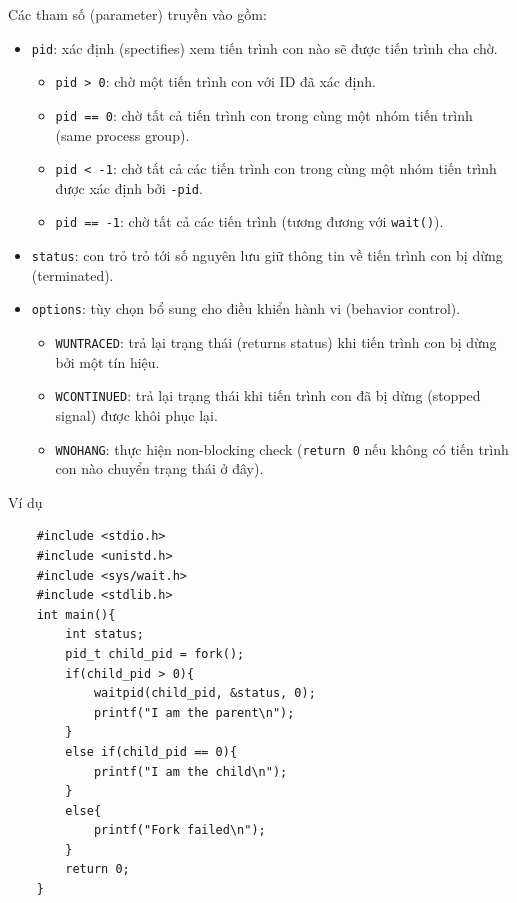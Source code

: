 \documentclass{article}
\begin{document}
\begin{enumerate}
\begin{verbatim}
\end{verbatim}
Các tham số (parameter) truyền vào gồm:
\begin{itemize}
    \item \verb|pid|: xác định (spectifies) xem tiến trình con nào sẽ được tiến trình cha chờ.
    \begin{itemize}
        \item \verb|pid > 0|: chờ một tiến trình con với ID đã xác định.
        \item \verb|pid == 0|: chờ tất cả tiến trình con trong cùng một nhóm tiến trình (same process group).
        \item \verb|pid < -1|: chờ tất cả các tiến trình con trong cùng một nhóm tiến trình được xác định bởi \verb|-pid|.
        \item \verb|pid == -1|: chờ tất cả các tiến trình (tương đương với \verb|wait()|).
    \end{itemize}
    \item \verb|status|: con trỏ trỏ tới số nguyên lưu giữ thông tin về tiến trình con bị dừng (terminated).
    \item \verb|options|: tùy chọn bổ sung cho điều khiển hành vi (behavior control).
    \begin{itemize}
        \item \verb|WUNTRACED|: trả lại trạng thái (returns status) khi tiến trình con bị dừng bởi một tín hiệu.
        \item \verb|WCONTINUED|: trả lại trạng thái khi tiến trình con đã bị dừng (stopped signal) được khôi phục lại.
        \item \verb|WNOHANG|: thực hiện non-blocking check (\verb|return 0| nếu không có tiến trình con nào chuyển trạng thái ở đây).
    \end{itemize}
\end{itemize}
\end{enumerate}
Ví dụ
\begin{verbatim}
    #include <stdio.h>
    #include <unistd.h>
    #include <sys/wait.h>
    #include <stdlib.h>
    int main(){
        int status;
        pid_t child_pid = fork();
        if(child_pid > 0){
            waitpid(child_pid, &status, 0);
            printf("I am the parent\n");
        }
        else if(child_pid == 0){
            printf("I am the child\n");
        }
        else{
            printf("Fork failed\n");
        }
        return 0;
    }
\end{verbatim}
\end{document}
